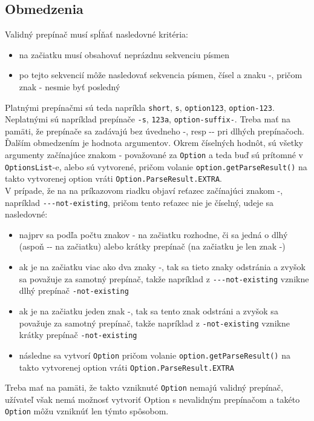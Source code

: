 \documentclass{article}
\begin{document}
\subsection{Obmedzenia}
\label{Obmedzenia}
Validný prepínač musí spĺňať nasledovné kritéria:
\begin{itemize}
	\item na začiatku musí obsahovať neprázdnu sekvenciu písmen
	\item po tejto sekvencií môže nasledovať sekvencia písmen, čísel a znaku -, pričom znak - nesmie byť posledný
\end{itemize}
Platnými prepínačmi sú teda napríkla \texttt{short}, \texttt{s}, \texttt{option123}, \texttt{option-123}. Neplatnými sú napríklad prepínače \texttt{-s}, \texttt{123a}, \texttt{option-suffix-}. Treba mať na pamäti, že prepínače sa zadávajú bez úvedneho -, resp -{}- pri dlhých prepínačoch.\\
Ďalším obmedzením je hodnota argumentov. Okrem číselných hodnôt, sú všetky argumenty začínajúce znakom - považované za \texttt{Option} a teda buď sú prítomné v \texttt{OptionsList}-e, alebo sú vytvorené, pričom volanie \texttt{option.getParseResult()} na takto vytvorenej option vráti \texttt{Option.ParseResult.EXTRA}.\\
V prípade, že na na príkazovom riadku objaví reťazec začínajúci znakom -, napríklad \texttt{-{}-{}-{}not-existing}, pričom tento reťazec nie je číselný, udeje sa nasledovné:
\begin{itemize}
	\item najprv sa podľa počtu znakov - na začiatku rozhodne, či sa jedná o dlhý (aspoň -{}- na začiatku) alebo krátky prepínač (na začiatku je len znak -)
	\item ak je na začiatku viac ako dva znaky -, tak sa tieto znaky odstránia a zvyšok sa považuje za samotný prepínač, takže napríklad z \texttt{-{}-{}-{}not-existing} vznikne dlhý prepínač \texttt{-not-existing}
    \item ak je na začiatku jeden znak -, tak sa tento znak odstráni a zvyšok sa považuje za samotný prepínač, takže napríklad z \texttt{-not-existing} vznikne krátky prepínač \texttt{-not-existing}
	\item následne sa vytvorí \texttt{Option} pričom volanie \texttt{option.getParseResult()} na takto vytvorenej option vráti \texttt{Option.ParseResult.EXTRA}
\end{itemize}
Treba mať na pamäti, že takto vzniknuté \texttt{Option} nemajú validný prepínač, užívateľ však nemá možnosť vytvoriť Option s nevalidným prepínačom a takéto \texttt{Option} môžu vzniknúť len týmto spôsobom.
\end{document}
